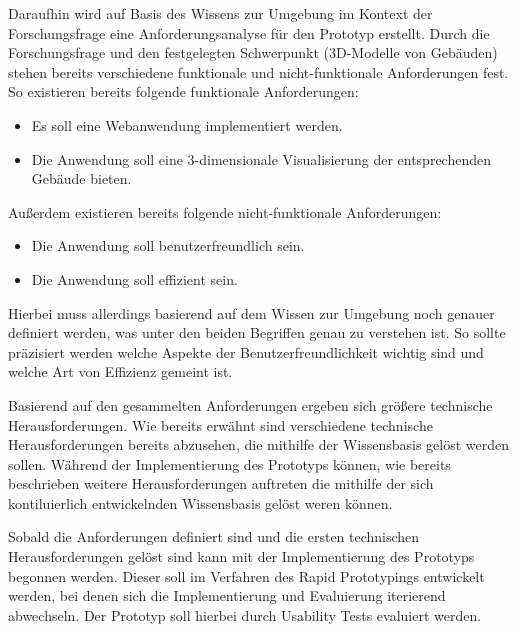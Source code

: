 Daraufhin wird auf Basis des Wissens zur Umgebung im Kontext der Forschungsfrage eine Anforderungsanalyse für den Prototyp erstellt. Durch die Forschungsfrage und den festgelegten Schwerpunkt (3D-Modelle von Gebäuden) stehen bereits verschiedene funktionale und nicht-funktionale Anforderungen fest. So existieren bereits folgende funktionale Anforderungen:

\begin{itemize}
    \item Es soll eine Webanwendung implementiert werden.
    \item Die Anwendung soll eine 3-dimensionale Visualisierung der entsprechenden Gebäude bieten.
\end{itemize}

\begin{samepage}
Außerdem existieren bereits folgende nicht-funktionale Anforderungen:

\nopagebreak
\begin{itemize}
    \item Die Anwendung soll benutzerfreundlich sein.
    \item Die Anwendung soll effizient sein.
\end{itemize}
\end{samepage}

Hierbei muss allerdings basierend auf dem Wissen zur Umgebung noch genauer definiert werden, was unter den beiden Begriffen genau zu verstehen ist. So sollte  präzisiert werden welche Aspekte der Benutzerfreundlichkeit wichtig sind und welche Art von Effizienz gemeint ist.

Basierend auf den gesammelten Anforderungen ergeben sich größere technische Herausforderungen. Wie bereits erwähnt sind verschiedene technische Herausforderungen bereits abzusehen, die mithilfe der Wissensbasis gelöst werden sollen. Während der Implementierung des Prototyps können, wie bereits beschrieben weitere Herausforderungen auftreten die mithilfe der sich kontiluierlich entwickelnden Wissensbasis gelöst weren können.

Sobald die Anforderungen definiert sind und die ersten technischen Herausforderungen gelöst sind kann mit der Implementierung des Prototyps begonnen werden. Dieser soll im Verfahren des Rapid Prototypings entwickelt werden, bei denen sich die Implementierung und Evaluierung iterierend abwechseln. Der Prototyp soll hierbei durch Usability Tests evaluiert werden.
